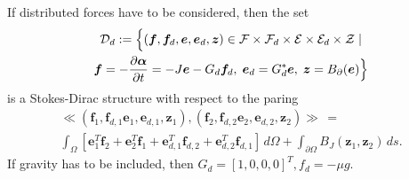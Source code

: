 \documentclass[preprint,12pt]{elsarticle}
\begin{document}
	If distributed forces have to be considered, then the set
	\begin{multline}
	\mathcal{D}_d := \Bigl\{ (\bm{f}, \bm{f}_d, \bm{e}, \bm{e}_d, \bm{z}) \in \mathcal{F}\times\mathcal{F}_d\times\mathcal{E}\times\mathcal{E}_d\times\mathcal{Z} \; |  \\ \bm{f}= - \diffp{\bm{\alpha}}{t} = -J \bm{e} - G_d \bm{f}_d, \; \bm{e}_d = G^*_d \bm{e}, \;  \bm{z} = B_{\partial}(\bm{e}) \Bigr\}
	\end{multline}
	is a Stokes-Dirac structure with respect to the paring 
	\begin{multline}
	\ll (\bm{f}_1, \bm{f}_{d, 1} \bm{e}_1, \bm{e}_{d, 1}, \bm{z}_1), (\bm{f}_2, \bm{f}_{d, 2} \bm{e}_2, \bm{e}_{d, 2}, \bm{z}_2) \gg  \,= \\
	\int_{\Omega} \left[ \bm{e}_1^T \bm{f}_2 + \bm{e}_2^T \bm{f}_1 + \bm{e}_{d, 1}^T \bm{f}_{d, 2} + \bm{e}_{d, 2}^T \bm{f}_{d, 1} \right] \, d\Omega  + \int_{\partial \Omega} B_J(\bm{z}_1, \bm{z}_2) \, ds.
	\end{multline}
	If gravity has to be included, then $G_d=[1, 0, 0, 0]^T, f_d = -\mu g$.  \\
	
\end{document}
